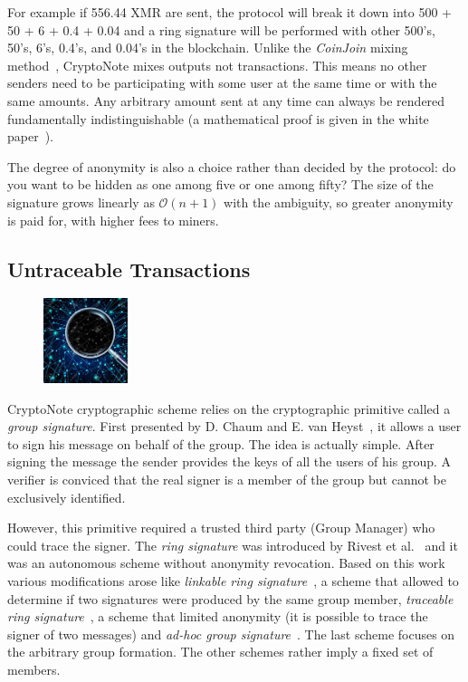 For example if 556.44 XMR are sent, the protocol will break it down into 500 + 50 + 6 + 0.4 + 0.04 and a ring signature will be performed with other 500's, 50's, 6's, 0.4's, and 0.04's in the blockchain. Unlike the \emph{CoinJoin} mixing method~\cite{coinjoin}, CryptoNote mixes outputs not transactions. This means no other senders need to be participating with some user at the same time or with the same amounts. Any arbitrary amount sent at any time can always be rendered fundamentally indistinguishable (a mathematical proof is given in the white paper~\cite{citeulike:14139412}).

The degree of anonymity is also a choice rather than decided by the protocol: do you want to be hidden as one among five or one among fifty? The size of the signature grows linearly as $\mathcal{O}(n+1)$ with the ambiguity, so greater anonymity is paid for, with higher fees to miners.

\subsection{Untraceable Transactions} \label{sec:untraceable}
\begin{figure}
\centering
\includegraphics[width=0.22\textwidth]{Images/CryptoNote/untraceable.jpg}
\end{figure}
CryptoNote cryptographic scheme relies on the cryptographic primitive called a \emph{group signature}. First presented by D. Chaum and E. van Heyst~\cite{group}, it allows a user to sign his message on behalf of the group. The idea is actually simple. After signing the message the sender provides the keys of all the users of his group. A verifier is conviced that the real signer is a member of the group but cannot be exclusively identified.

However, this primitive required a trusted third party (Group Manager) who could trace the signer. The \emph{ring signature} was introduced by Rivest et al.~\cite{ring} and it was an autonomous scheme without anonymity revocation. Based on this work various modifications arose like \emph{linkable ring signature}~\cite{link1,link2,short}, a scheme that allowed to determine if two signatures were produced by the same group member, \emph{traceable ring signature}~\cite{traceable1,traceable2}, a scheme that limited anonymity (it is possible to trace the signer of two messages) and \emph{ad-hoc group signature}~\cite{ad-hoc1,ad-hoc2}. The last scheme focuses on the arbitrary group formation. The other schemes rather imply a fixed set of members.

